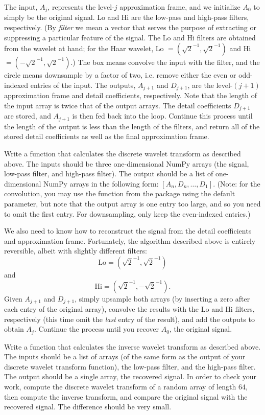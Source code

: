 The input, $A_j$, represents the level-$j$ approximation frame, and we initialize $A_0$ to
simply be the original signal. Lo and Hi are the low-pass and high-pass filters, respectively.
(By \emph{filter} we mean a vector that serves the purpose of extracting or suppressing a
particular feature of the signal. The Lo and Hi filters are obtained from the wavelet at hand;
for the Haar wavelet, Lo $= (\sqrt{2}^{-1}, \sqrt{2}^{-1})$ and Hi $= (-\sqrt{2}^{-1}, \sqrt{2}
^{-1})$.) The box means convolve the input with the filter, and the circle means downsample by
a factor of two, i.e. remove either the even or odd-indexed entries of the input. The outputs,
$A_{j+1}$ and $D_{j+1}$, are the level-$(j+1)$ approximation frame and detail coefficients,
respectively. Note that the length of the input array is twice that of the output arrays. The
detail coefficients $D_{j+1}$ are stored, and $A_{j+1}$ is then fed back into the loop. Continue
this process until the length of the output is less than the length of the filters, and
return all of the stored detail coefficients as well as the final approximation frame.
\begin{problem}
Write a function that calculates the discrete wavelet transform as described above.
The inputs should be three one-dimensional NumPy arrays (the signal, low-pass filter, and
high-pass filter). The output should be a list of one-dimensional NumPy arrays in the
following form: $[A_n, D_n, \ldots, D_1]$. (Note: for the convolution, you may use
the  function from the  package using the default
 parameter, but note that the output array is one entry too large, and so
you need to omit the first entry. For downsampling, only keep the even-indexed entries.)
\end{problem}
We also need to know how to reconstruct the signal from the detail coefficients and
approximation frame. Fortunately, the algorithm described above is entirely reversible,
albeit with slightly different filters:
$$\text{Lo} = (\sqrt{2}^{-1}, \sqrt{2}^{-1})$$ and
$$\text{Hi} = (\sqrt{2}^{-1}, -\sqrt{2}^{-1}).$$
Given $A_{j+1}$ and $D_{j+1}$, simply upsample both arrays (by inserting a zero after
each entry of the original array), convolve the results
with the Lo and Hi filters, respectively (this time omit the \emph{last} entry of the
result), and add the outputs to obtain $A_j$. Continue the
process until you recover $A_0$, the original signal.
\begin{problem}
Write a function that calculates the inverse wavelet transform as described above.
The inputs should be a list of arrays (of the same form as the output of your discrete
wavelet transform function), the low-pass filter, and the high-pass filter. The output
should be a single array, the recovered signal. In order to check your work, compute
the discrete wavelet transform of a random array of length 64, then compute the inverse
transform, and compare the original signal with the recovered signal. The difference
should be very small.
\end{problem}

